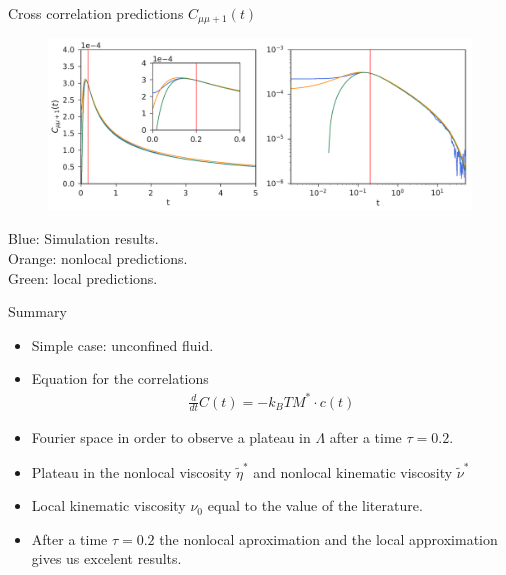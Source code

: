 \documentclass{beamer}
\begin{document}
\begin{frame}{Cross correlation predictions $C_{\mu\mu+1}(t)$}
\begin{figure}[h!]
\includegraphics[width=\linewidth]{Predictionsmumu+1-PBC}
\end{figure}
{\color{blue} Blue}: Simulation results. \\
{\color{orange} Orange}: nonlocal predictions.\\ 
{\color{green} Green}: local predictions.\\
\end{frame}

\begin{frame}{Summary}
  \begin{itemize}
    \item Simple case: unconfined fluid.
    \item Equation for the correlations
      \begin{align}
        \frac{d}{dt}C(t)=-k_BTM^*\cdot c(t)
        \nonumber
      \end{align}
    \item Fourier space in order to observe a plateau in $\Lambda$ after a time $\tau=0.2$.
    \item Plateau in the nonlocal viscosity $\tilde{\eta}^*$ and nonlocal kinematic viscosity $\tilde{\nu}^*$
    \item Local kinematic viscosity $\nu_0$ equal to the value of the literature.
    \item After a time $\tau=0.2$ the nonlocal aproximation and the local approximation gives us excelent results. 
  \end{itemize}
\end{frame}
\end{document}
